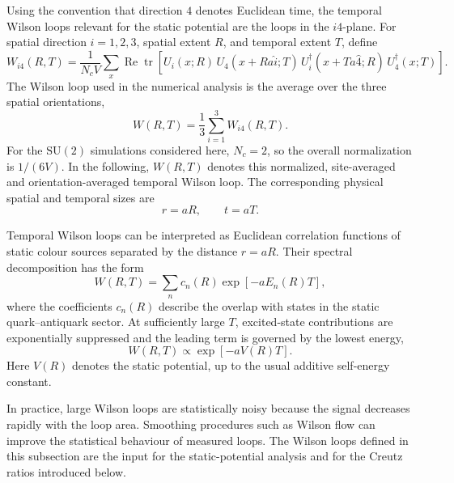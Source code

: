 \documentclass[12pt,a4paper,oneside,numbers=noenddot]{scrreprt}
\newcommand{\SU}{\mathrm{SU}}
\newcommand{\latspacing}{a}
\begin{document}
Using the convention that direction \(4\) denotes Euclidean time, the temporal
Wilson loops relevant for the static potential are the loops in the \(i4\)-plane.
For spatial direction \(i=1,2,3\), spatial extent \(R\), and temporal extent
\(T\), define
\begin{equation}
  W_{i4}(R,T)
  =
  \frac{1}{N_c V}
  \sum_x
  \operatorname{Re}\operatorname{tr}
  \left[
    U_i(x;R)\,
    U_4(x+R\latspacing\hat i;T)\,
    U_i^\dagger(x+T\latspacing\hat 4;R)\,
    U_4^\dagger(x;T)
  \right].
  \label{eq:temporal-wilson-loop-orientation}
\end{equation}
The Wilson loop used in the numerical analysis is the average over the three
spatial orientations,
\begin{equation}
  W(R,T)
  =
  \frac{1}{3}
  \sum_{i=1}^{3}
  W_{i4}(R,T).
  \label{eq:temporal-wilson-loop-spatial-average}
\end{equation}
For the \(\SU(2)\) simulations considered here, \(N_c=2\), so the overall
normalization is \(1/(6V)\). In the following, \(W(R,T)\) denotes this
normalized, site-averaged and orientation-averaged temporal Wilson loop.
The corresponding physical spatial and temporal sizes are
\begin{equation}
  r = \latspacing R,
  \qquad
  t = \latspacing T.
\end{equation}

Temporal Wilson loops can be interpreted as Euclidean correlation functions of
static colour sources separated by the distance \(r=\latspacing R\). Their
spectral decomposition has the form
\begin{equation}
  W(R,T)
  =
  \sum_n c_n(R)\exp[-\latspacing E_n(R)T],
  \label{eq:wilson-loop-spectral-decomposition}
\end{equation}
where the coefficients \(c_n(R)\) describe the overlap with states in the
static quark--antiquark sector. At sufficiently large \(T\), excited-state
contributions are exponentially suppressed and the leading term is governed by
the lowest energy, 
\begin{equation}
  W(R,T)
  \propto
  \exp[-\latspacing V(R)T].
  \label{eq:wilson-loop-static-potential}
\end{equation}
Here \(V(R)\) denotes the static potential, up to the usual additive
self-energy constant.

In practice, large Wilson loops are statistically noisy because the signal
decreases rapidly with the loop area. Smoothing procedures such as Wilson flow
can improve the statistical behaviour of measured loops. The Wilson loops
defined in this subsection are the input for the static-potential analysis and
for the Creutz ratios introduced below.
\end{document}
